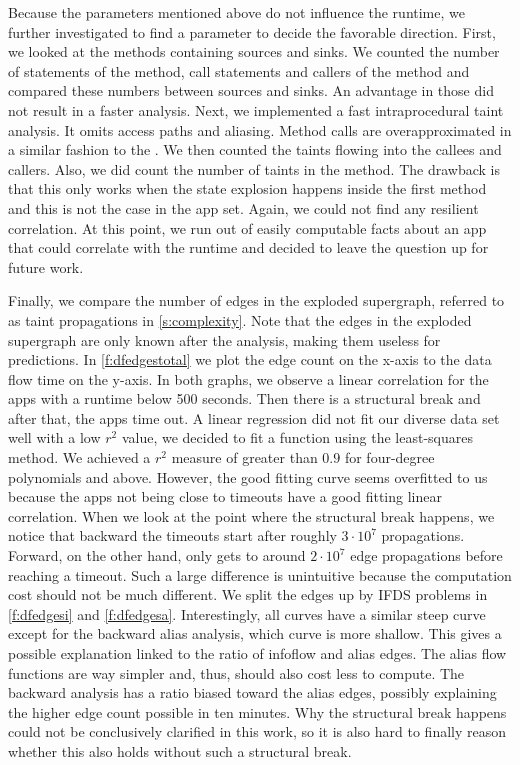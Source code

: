 \documentclass[../draft.tex]{subfiles}
\begin{document}
    Because the parameters mentioned above do not influence the runtime, we further investigated to find a parameter to decide the favorable direction.
    First, we looked at the methods containing sources and sinks.
    We counted the number of statements of the method, call statements and callers of the method and compared these numbers between sources and sinks.
    An advantage in those did not result in a faster analysis.
    Next, we implemented a fast intraprocedural taint analysis. It omits access paths and aliasing.
    Method calls are overapproximated in a similar fashion to the .
    We then counted the taints flowing into the callees and callers.
    Also, we did count the number of taints in the method.
    The drawback is that this only works when the state explosion happens inside the first method and this is not the case in the app set.
    Again, we could not find any resilient correlation.
    At this point, we run out of easily computable facts about an app that could correlate with the runtime and decided to leave the question up for future work.

    Finally, we compare the number of edges in the exploded supergraph, referred to as taint propagations in \autoref{s:complexity}.
    Note that the edges in the exploded supergraph are only known after the analysis, making them useless for predictions.
    In \autoref{f:dfedgestotal} we plot the edge count on the x-axis to the data flow time on the y-axis.
    In both graphs, we observe a linear correlation for the apps with a runtime below 500 seconds.
    Then there is a structural break and after that, the apps time out.
    A linear regression did not fit our diverse data set well with a low $r^2$ value, we decided to fit a function using the least-squares method. We achieved a $r^2$ measure of greater than $0.9$ for four-degree polynomials and above.
    However, the good fitting curve seems overfitted to us because the apps not being close to timeouts have a good fitting linear correlation.
    When we look at the point where the structural break happens, we notice that backward the timeouts start after roughly $3 \cdot 10^7$ propagations.
    Forward, on the other hand, only gets to around $2 \cdot 10^7$ edge propagations before reaching a timeout.
    Such a large difference is unintuitive because the computation cost should not be much different.
    We split the edges up by IFDS problems in \autoref{f:dfedgesi} and \autoref{f:dfedgesa}.
    Interestingly, all curves have a similar steep curve except for the backward alias analysis, which curve is more shallow.
    This gives a possible explanation linked to the ratio of infoflow and alias edges.
    The alias flow functions are way simpler and, thus, should also cost less to compute.
    The backward analysis has a ratio biased toward the alias edges, possibly explaining the higher edge count possible in ten minutes.
    Why the structural break happens could not be conclusively clarified in this work\footnotemark{}, so it is also hard to finally reason whether this also holds without such a structural break.
\end{document}
